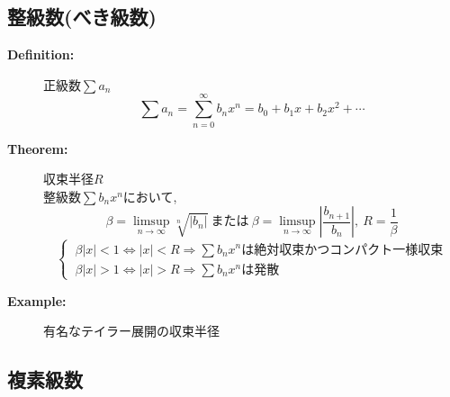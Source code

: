 \documentclass[dvipdfmx]{jsarticle}
\begin{document}
    \subsection{整級数(べき級数)}
    \begin{description}
        \item[\bf{Definition:}] 正級数$\sum a_n$\\
            $$ \sum a_n = \sum_{n=0}^{\infty} b_n x^n = b_0 + b_1x + b_2x^2 + \cdots $$

        \item[\bf{Theorem:}] 収束半径$R$ \\
            整級数$\sum b_nx^n$において,
            $$\beta =\limsup_{n \to \infty} \sqrt[n]{|b_n|} \ \text{または} \ \beta =\limsup_{n \to \infty} |\frac{b_{n+1}}{b_n}|,\ R = \frac{1}{\beta}$$
            $$\begin{cases} \ \beta|x| < 1 \Leftrightarrow |x| < R \Rightarrow \sum b_nx^n \text{は絶対収束かつコンパクト一様収束} \\ 
            \ \beta|x| > 1 \Leftrightarrow |x| > R \Rightarrow \sum b_{n}x^n \text{は発散} \end{cases} $$

        \item[\bf{Example:}] 有名なテイラー展開の収束半径 \\
    
    \end{description}
    \subsection{複素級数}
\end{document}
